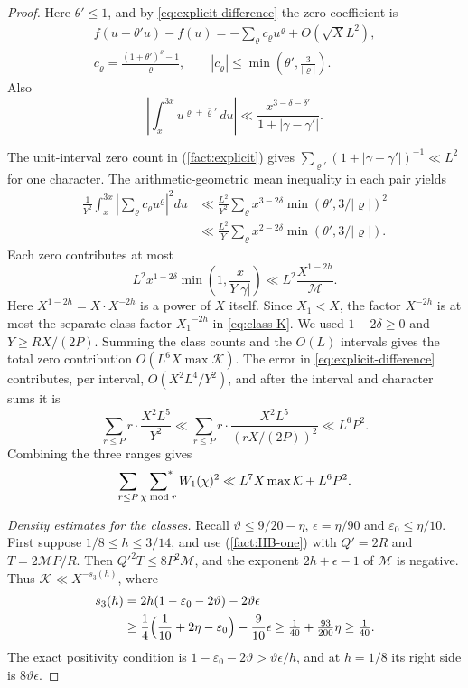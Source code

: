 \documentclass{amsart}
\newcounter{fact}
\numberwithin{equation}{section}
\numberwithin{table}{section}
\newcommand{\sums}{\sideset{}{^*}\sum}
\begin{document}
\begin{proof}
Here $\theta'\le1$, and by \eqref{eq:explicit-difference} the zero
coefficient is
\begin{gather*}
f(u+\theta'u)-f(u)
=-\sum_{\varrho}c_{\varrho}u^{\varrho}+O(\sqrt X L^2),\\
c_{\varrho}=\frac{(1+\theta')^{\varrho}-1}{\varrho},
\qquad |c_{\varrho}|\le\min\left(\theta',\frac3{|\varrho|}\right).
\end{gather*}
Also
\[
\left|\int_x^{3x}u^{\varrho+\bar\varrho'}\,du\right|
\ll\frac{x^{3-\delta-\delta'}}{1+|\gamma-\gamma'|}.
\]

The unit-interval zero count in (\ref{fact:explicit}) gives
$\sum_{\varrho'}(1+|\gamma-\gamma'|)^{-1}\ll L^2$ for one character.
The arithmetic-geometric mean inequality in each pair yields
\begin{align*}
\frac1{Y^2}\int_x^{3x}\left|\sum_\varrho c_\varrho u^\varrho\right|^2du
&\ll\frac{L^2}{Y^2}\sum_\varrho
x^{3-2\delta}\min(\theta',3/|\varrho|)^2\\
&\ll\frac{L^2}{Y}\sum_\varrho
x^{2-2\delta}\min(\theta',3/|\varrho|).
\end{align*}
Each zero contributes at most
\[
L^2x^{1-2\delta}\min\left(1,\frac{x}{Y|\gamma|}\right)
\ll L^2\frac{X^{1-2h}}{\mathcal M}.
\]
Here $X^{1-2h}=X\cdot X^{-2h}$ is a power of $X$ itself.
Since $X_1<X$, the factor $X^{-2h}$ is at most the separate class factor ${X_1}^{-2h}$ in \eqref{eq:class-K}.
We used $1-2\delta\ge0$ and $Y\ge RX/(2P)$.
Summing the class counts and the $O(L)$ intervals gives the total zero
contribution $O(L^6X\max\mathcal K)$. The error in \eqref{eq:explicit-difference} contributes, per interval,
$O(X^2L^4/Y^2)$, and after the interval and character sums it is
\[
\sum_{r\le P}r\cdot\frac{X^2L^5}{Y^2}
\ll\sum_{r\le P}r\cdot
\frac{X^2L^5}{(rX/(2P))^2}
\ll L^6P^2.
\]
Combining the three ranges gives
\begin{equation}\label{eq:W-class-bound}
\sum_{r\le P}\;\sums_{\chi\bmod r}W_1(\chi)^2
\ll L^7X\max\mathcal K+L^6P^2.
\end{equation}

\noindent\textit{Density estimates for the classes.}
Recall $\vartheta\le9/20-\eta$, $\epsilon=\eta/90$ and
$\varepsilon_0\le\eta/10$.
First suppose $1/8\le h\le3/14$, and use (\ref{fact:HB-one}) with
$Q'=2R$ and $T=2\mathcal MP/R$. Then $Q'^2T\le8P^2\mathcal M$, and the
exponent $2h+\epsilon-1$ of $\mathcal M$ is negative. Thus $\mathcal K\ll X^{-s_3(h)}$, where
\begin{equation}\label{eq:density-s3}
\begin{split}
s_3(h)&=2h(1-\varepsilon_0-2\vartheta)-2\vartheta\epsilon\\
&\ge\frac14\Bigl(\frac1{10}+2\eta-\varepsilon_0\Bigr)
-\frac9{10}\epsilon
\ge\tfrac1{40}+\tfrac{93}{200}\eta\ge\tfrac1{40}.
\end{split}
\end{equation}
The exact positivity condition is
$1-\varepsilon_0-2\vartheta>\vartheta\epsilon/h$, and at $h=1/8$ its
right side is $8\vartheta\epsilon$.


\end{proof}
\end{document}

